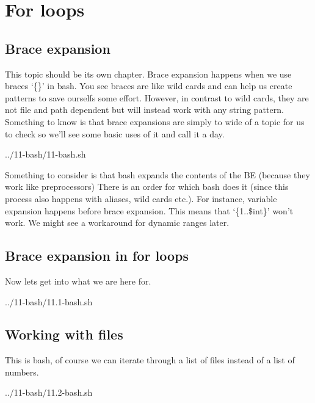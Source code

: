 \chapter{For loops}

\section{Brace expansion}

This topic should be its own chapter. Brace expansion happens when we use braces `\{\}' in bash.
You see braces are like wild cards and can help us create patterns to save ourselfs some effort. However,
in contrast to wild cards, they are not file and path dependent but will instead work with any string pattern.
Something to know is that brace expansions are simply to wide of a topic for us to check so we'll see some basic
uses of it and call it a day.


{../11-bash/11-bash.sh}

Something to consider is that bash expands the contents of the BE (because they work like preprocessors)
There is an order for which bash does it (since this process also happens with aliases, wild cards etc.).
For instance, variable expansion happens before brace expansion. This means that `\{1..\$int\}'
won't work. We might see a workaround for dynamic ranges later.

\section{Brace expansion in for loops}

Now lets get into what we are here for.



{../11-bash/11.1-bash.sh}

\section{Working with files}

This is bash, of course we can iterate through a list of files instead of a list of numbers.


{../11-bash/11.2-bash.sh}